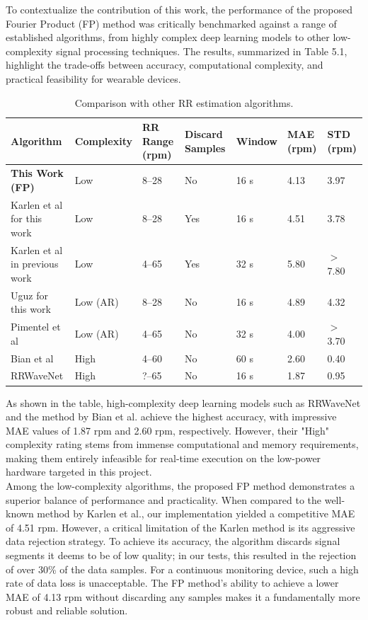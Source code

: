 \documentclass[12pt,a4paper]{report}
\begin{document}
 To contextualize the contribution of this work, the performance of the proposed Fourier Product (FP) method was critically benchmarked against a range of established algorithms, from highly complex deep learning models to other low-complexity signal processing techniques. The results, summarized in Table 5.1, highlight the trade-offs between accuracy, computational complexity, and practical feasibility for wearable devices.

\begin{table}[h!]
\centering
\caption{Comparison with other RR estimation algorithms.}
\label{tab:stateofart}
\begin{tabular}
{|p{2.75cm}|p{2.5cm}|p{1.45cm}|p{1.75cm}|p{1.85cm}|p{1.15cm}|p{1.15cm}|}

\hline
\textbf{Algorithm} & \textbf{Complexity} & \textbf{RR Range (rpm)} & \textbf{Discard Samples} & \textbf{Window} & \textbf{MAE (rpm)} & \textbf{STD (rpm)} \\ \hline
\textbf{This Work (FP)} & Low & 8--28 & No & 16 s & 4.13 & 3.97 \\ \hline
Karlen et al for this work & Low & 8--28 & Yes & 16 s & 4.51 & 3.78 \\ \hline
Karlen et al in previous work & Low & 4--65 & Yes & 32 s & 5.80 & $>$7.80 \\ \hline
Uguz for this work & Low (AR) & 8--28 & No & 16 s & 4.89 & 4.32 \\ \hline
Pimentel et al & Low (AR) & 4--65 & No & 32 s & 4.00 & $>$3.70 \\ \hline
Bian et al & High & 4--60 & No & 60 s & 2.60 & 0.40 \\ \hline
RRWaveNet & High & ?--65 & No & 16 s & 1.87 & 0.95 \\ \hline
\end{tabular}
\end{table}

 As shown in the table, high-complexity deep learning models such as RRWaveNet and the method by Bian et al. achieve the highest accuracy, with impressive MAE values of 1.87 rpm and 2.60 rpm, respectively. However, their "High" complexity rating stems from immense computational and memory requirements, making them entirely infeasible for real-time execution on the low-power hardware targeted in this project.\\

 Among the low-complexity algorithms, the proposed FP method demonstrates a superior balance of performance and practicality. When compared to the well-known method by Karlen et al., our implementation yielded a competitive MAE of 4.51 rpm. However, a critical limitation of the Karlen method is its aggressive data rejection strategy. To achieve its accuracy, the algorithm discards signal segments it deems to be of low quality; in our tests, this resulted in the rejection of over 30\% of the data samples. For a continuous monitoring device, such a high rate of data loss is unacceptable. The FP method's ability to achieve a lower MAE of 4.13 rpm without discarding any samples makes it a fundamentally more robust and reliable solution.\\
 
\end{document}
